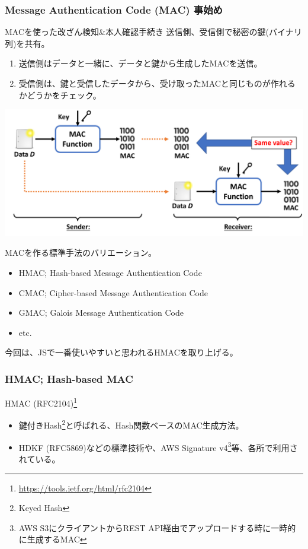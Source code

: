 \documentclass[12pt,dvipdfmx]{beamer}
\begin{document}
\begin{frame}
\frametitle{Message Authentication Code (MAC) 事始め}
\begin{block}{\small MACを使った改ざん検知\&本人確認手続き}
\small
送信側、受信側で秘密の鍵(バイナリ列)を共有。
\begin{enumerate}
\item 送信側はデータと一緒に、データと鍵から生成したMACを送信。
\item 受信側は、鍵と受信したデータから、受け取ったMACと同じものが作れるかどうかをチェック。
\end{enumerate}
\end{block}

\begin{center}
\includegraphics[width=0.9\linewidth]{Figs/mac-flow02.pdf}
\end{center}
\end{frame}

\begin{frame}
MACを作る標準手法のバリエーション。 
\begin{itemize} 
 \item \alert{HMAC; Hash-based Message Authentication Code}
 \item CMAC; Cipher-based Message Authentication Code
 \item GMAC; Galois Message Authentication Code
 \item etc.
\end{itemize}
今回は、JSで一番使いやすいと思われるHMACを取り上げる。
\end{frame}


\begin{frame}
\frametitle{HMAC; Hash-based MAC}
\begin{block}{\small HMAC (RFC2104)\footnote[frame]{\scriptsize \url{https://tools.ietf.org/html/rfc2104}}}
\begin{itemize}
 \item 鍵付きHash\footnote[frame]{\scriptsize Keyed Hash}と呼ばれる、Hash関数ベースのMAC生成方法。
 \item HDKF (RFC5869)などの標準技術や、AWS Signature v4\footnote[frame]{\scriptsize AWS S3にクライアントからREST API経由でアップロードする時に一時的に生成するMAC}等、各所で利用されている。
\end{itemize}
\end{block}
\end{frame}
\end{document}
